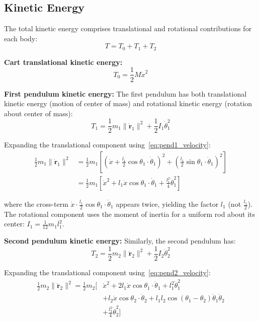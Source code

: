 \subsection{Kinetic Energy}

The total kinetic energy comprises translational and rotational contributions for each body:
\begin{equation}
T = T_0 + T_1 + T_2
\label{eq:kinetic_total}
\end{equation}

\textbf{Cart translational kinetic energy:}
\begin{equation}
T_0 = \frac{1}{2}M \dot{x}^2
\label{eq:cart_kinetic}
\end{equation}

\textbf{First pendulum kinetic energy:}
The first pendulum has both translational kinetic energy (motion of center of mass) and rotational kinetic energy (rotation about center of mass):
\begin{equation}
T_1 = \frac{1}{2}m_1 \|\dot{\mathbf{r}}_1\|^2 + \frac{1}{2}I_1 \dot{\theta}_1^2
\label{eq:pend1_kinetic}
\end{equation}

Expanding the translational component using~\eqref{eq:pend1_velocity}:
\begin{align}
\frac{1}{2}m_1 \|\dot{\mathbf{r}}_1\|^2 &= \frac{1}{2}m_1 \left[ \left(\dot{x} + \frac{l_1}{2}\cos\theta_1 \cdot \dot{\theta}_1\right)^2 + \left(\frac{l_1}{2}\sin\theta_1 \cdot \dot{\theta}_1\right)^2 \right] \nonumber \\
&= \frac{1}{2}m_1 \left[ \dot{x}^2 + l_1 \dot{x} \cos\theta_1 \cdot \dot{\theta}_1 + \frac{l_1^2}{4}\dot{\theta}_1^2 \right]
\label{eq:pend1_kinetic_expanded}
\end{align}

where the cross-term $\dot{x} \cdot \frac{l_1}{2}\cos\theta_1 \cdot \dot{\theta}_1$ appears twice, yielding the factor $l_1$ (not $\frac{l_1}{2}$). The rotational component uses the moment of inertia for a uniform rod about its center: $I_1 = \frac{1}{12}m_1 l_1^2$.

\textbf{Second pendulum kinetic energy:}
Similarly, the second pendulum has:
\begin{equation}
T_2 = \frac{1}{2}m_2 \|\dot{\mathbf{r}}_2\|^2 + \frac{1}{2}I_2 \dot{\theta}_2^2
\label{eq:pend2_kinetic}
\end{equation}

Expanding the translational component using~\eqref{eq:pend2_velocity}:
\begin{align}
\frac{1}{2}m_2 \|\dot{\mathbf{r}}_2\|^2 = \frac{1}{2}m_2 \Big[ &\dot{x}^2 + 2l_1 \dot{x} \cos\theta_1 \cdot \dot{\theta}_1 + l_1^2 \dot{\theta}_1^2 \nonumber \\
&+ l_2 \dot{x} \cos\theta_2 \cdot \dot{\theta}_2 + l_1 l_2 \cos(\theta_1 - \theta_2) \dot{\theta}_1 \dot{\theta}_2 \nonumber \\
&+ \frac{l_2^2}{4}\dot{\theta}_2^2 \Big]
\label{eq:pend2_kinetic_expanded}
\end{align}

